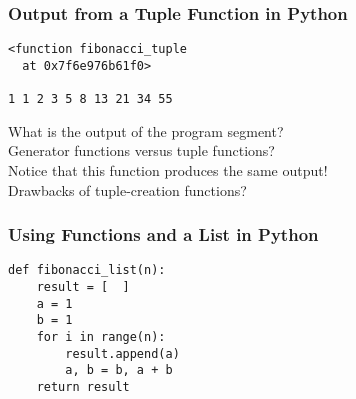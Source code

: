 \documentclass[14pt,aspectratio=169]{beamer}
\begin{document}
%
\begin{frame}[fragile]
  \frametitle{Output from a Tuple Function in Python}
  \normalsize
  \begin{minipage}{6in}
    \vspace*{.1in}
    \begin{verbatim}
<function fibonacci_tuple
  at 0x7f6e976b61f0>

1 1 2 3 5 8 13 21 34 55

    \end{verbatim}
  \vspace*{.35in}
  \begin{minipage}{5.2in}
  \begin{center}
    \normalsize \noindent What is the output of the program segment? \\
    \normalsize \noindent Generator functions versus tuple functions? \\
    \normalsize \noindent Notice that this function produces the same output! \\
    \normalsize \noindent Drawbacks of tuple-creation functions? \\
  \end{center}
  \end{minipage}
  \end{minipage}
\end{frame}

%
\begin{frame}[fragile]
  \frametitle{Using Functions and a List in Python}
  \normalsize
  \begin{minipage}{6in}
    \vspace*{.1in}
    \begin{verbatim}
def fibonacci_list(n):
    result = [  ]
    a = 1
    b = 1
    for i in range(n):
        result.append(a)
        a, b = b, a + b
    return result
    \end{verbatim}
  \end{minipage}
\end{frame}
\end{document}
